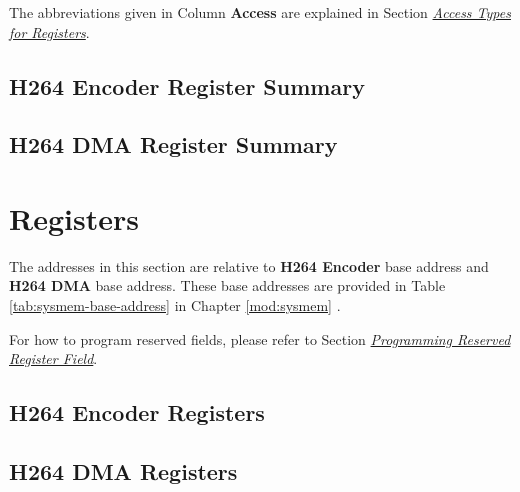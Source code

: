 \documentclass[main\_\_EN.tex]{subfiles}
\begin{document}
The abbreviations given in Column \textbf{Access} are explained in Section \hyperref[glossary-access-types]{\textit{Access Types for Registers}}.


\hypertarget{h264enc-reg-summ}{}
\subsection{H264 Encoder Register Summary}
\label{sec:h264enc-reg-summ}





\hypertarget{h264enc-dma-reg-summ}{}
\subsection{H264 DMA Register Summary}
\label{sec:h264enc-dma-reg-summ}







\clearpage
\section{Registers}

The addresses in this section are relative to \textbf{H264 Encoder} base address and \textbf{H264 DMA} base address. These base addresses are provided in Table \ref{tab:sysmem-base-address} in Chapter \ref{mod:sysmem} \textit{}.

For how to program reserved fields, please refer to Section \hyperref[programming-reserved-field]{\textit{Programming Reserved Register Field}}.


\subsection{H264 Encoder Registers}




\clearpage
\subsection{H264 DMA Registers}


\end{document}
